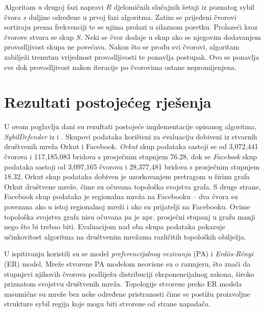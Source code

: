 \documentclass[times, utf8, seminar, numeric]{fer}
\begin{document}
Algoritam u drugoj fazi napravi $R$ djelomičnih slučajnih šetnji iz poznatog sybil čvora $s$ duljine određene u prvoj fazi algoritma. Zatim se prijeđeni čvorovi sortiraju prema frekvenciji te se njima prolazi u silaznom poretku. Prolazeći kroz čvorove stvara se skup $S$. Neki se čvor dodaje u skup ako se njegovim dodavanjem provodljivost skupa ne povećava. Nakon što se prođu svi čvorovi, algoritam zabilježi trenutnu vrijednost provodljivosti te ponavlja postupak. Ovo se ponavlja sve dok provodljivost nakon iteracije po čvorovima ostane nepromijenjena.

\chapter{Rezultati postojećeg rješenja} \label{ch:results}
U ovom poglavlju dani su rezultati postojeće implementacije opisanog algoritma, \textit{SybilDefender} iz \cite{sybil-defender-old} i \cite{sybil-defender}. Skupovi podataka korišteni za evaluaciju dobiveni iz stvarnih društvenih mreža Orkut i Facebook. \textit{Orkut} skup podataka sastoji se od 3,072,441 čvorova i 117,185,083 bridova s prosječnim stupnjem 76.28, dok se \textit{Facebook} skup podataka sastoji od 3,097,165 čvorova i 28,377,481 bridova s prosječnim stupnjem 18.32. Orkut skup podataka dobiven je uzorkovanjem pretragom u širinu grafa Orkut društvene mreže, čime su očuvana topološka svojstva grafa. S druge strane, Facebook skup podataka je regionalna mreža na Facebooku -- dva čvora su povezana ako u istoj regionalnoj mreži i ako su prijatelji na Facebooku. Ovime topološka svojstva grafa nisu očuvana pa je npr. prosječni stupanj u grafu manji nego što bi trebao biti. Evaluacijom nad oba skupa podataka pokazuje učinkovitost algoritma na društvenim mrežama različitih topoloških obilježja.

U ispitivanju koristili su se model \textit{preferencijalnog vezivanja}  (PA) i \textit{Erdös-Rényi} (ER) model. Mreže stvorene PA modelom neovisne su o razmjeru, što znači da stupnjevi njihovih čvorova podliježu distribuciji eksponencijalnog zakona, široko priznatom svojstvu društvenih mreža. Topologije stvorene preko ER modela nasumične su mreže bez neke određene pristranosti čime se postižu proizvoljne strukture sybil regija koje mogu biti stvorene od strane napadača.
\end{document}
